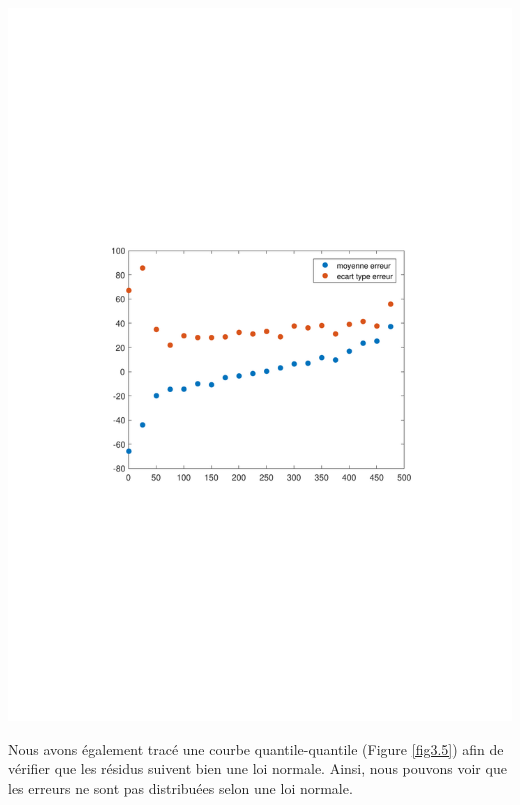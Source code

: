 \documentclass{scrreprt}
\begin{document}
  

\begin{center}
\includegraphics[trim = 3cm 9cm 3cm 9cm, clip]{residuMoyen.pdf}
\label{fig3}
\end{center}

Nous avons également tracé une courbe quantile-quantile (Figure \ref{fig3.5}) afin de vérifier que les résidus suivent bien une loi normale. Ainsi, nous pouvons voir que les erreurs ne sont pas distribuées selon une loi normale.
\end{document}
